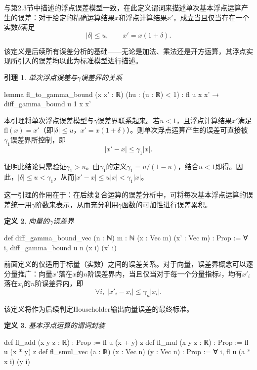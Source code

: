 ﻿\documentclass[UTF8,a4paper,openany]{ctexbook}
\theoremstyle{qrplain}
\newtheorem{definition}{定义}[chapter]
\newtheorem{lemma}[definition]{引理}
{}
\begin{document}
与第2.3节中描述的浮点误差模型一致，在此定义谓词来描述单次基本浮点运算产生的误差：对于给定的精确运算结果$x$和浮点计算结果$x'$，成立当且仅当存在一个实数$\delta$满足
$$
|\delta|\le u,\qquad x' = x(1+\delta).
$$

该定义是后续所有误差分析的基础——无论是加法、乘法还是开方运算，其浮点实现所引入的误差均以此为标准模型进行描述。

\begin{lemma}
  单次浮点误差与$\gamma$误差界的关系
\end{lemma}
\begin{leancode}
  lemma fl_to_gamma_bound (x x' : ℝ) (hu : (u : ℝ) < 1) :
    fl u x x' → diff_gamma_bound u 1 x x'
\end{leancode}

本引理将单次浮点误差模型与$\gamma$误差界联系起来。若$u<1$，且浮点计算结果$x'$满足$\mathrm{fl}(x)=x'$（即$|\delta|\le u$，$x'=x(1+\delta)$）。则单次浮点运算产生的误差可直接被$\gamma_1$误差界所控制，即
$$
|x'-x| \le \gamma_1|x|.
$$

证明此结论只需验证$\gamma_1 > u$。由$\gamma_1$的定义$\gamma_1=u/(1-u)$，结合$u<1$即得。因此，$|\delta|\le u<\gamma_1$，从而$|x'-x|\le u|x|<\gamma_1|x|$。

这一引理的作用在于：在后续复合运算的误差分析中，可将每次基本浮点运算的误差统一用$\gamma$阶数来表示，从而充分利用$\gamma$函数的可加性进行误差累积。

\begin{definition}
  向量的$\gamma$误差界
\end{definition}
\begin{leancode}
  def diff_gamma_bound_vec (n : ℕ) {m : ℕ} (x : Vec m) (x' : Vec m) : 
    Prop := ∀ i, diff_gamma_bound u n (x i) (x' i)
\end{leancode}

前面定义的仅适用于标量（实数）之间的误差关系。对于向量，误差界概念可以逐分量推广：向量$x'$落在$x$的$n$阶误差界内，当且仅当对于每一个分量指标$i$，均有$x'_i$落在$x_i$的$n$阶误差界内，即
$$
\forall i,\; |x'_i - x_i| \le \gamma_n|x_i|.
$$

该定义将作为后续判定Householder输出向量误差的最终标准。

\begin{definition}
  基本浮点运算的谓词封装
\end{definition}
\begin{leancode}
  def fl_add (x y z : ℝ) : Prop :=
    fl u (x + y) z
  def fl_mul (x y z : ℝ) : Prop :=
    fl u (x * y) z
  def fl_smul_vec (a : ℝ)
    (x : Vec n) (y : Vec n) : Prop :=
      ∀ i, fl u (a * x i) (y i)
\end{leancode}
\end{document}
